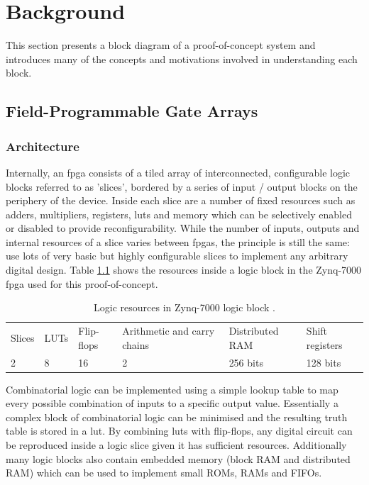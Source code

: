 \chapter{Background}

This section presents a block diagram of a proof-of-concept system and introduces many of the concepts and motivations involved in understanding each block.

\section{Field-Programmable Gate Arrays}

\subsection{Architecture}
Internally, an \gls{fpga} consists of a tiled array of interconnected, configurable logic blocks referred to as 'slices', bordered by a series of input / output blocks on the periphery of the device. Inside each slice are a number of fixed resources such as adders, multipliers, registers, \glspl{lut} and memory which can be selectively enabled or disabled to provide reconfigurability. While the number of inputs, outputs and internal resources of a slice varies between \glspl{fpga}, the principle is still the same: use lots of very basic but highly configurable slices to implement any arbitrary digital design. Table \ref{table:clb_resources} shows the resources inside a logic block in the Zynq-7000 \gls{fpga} used for this proof-of-concept.

\begin{table}
    \begin{tabular}{llllll}
        Slices  & LUTs  & Flip-flops    & Arithmetic and carry chains   & Distributed RAM   & Shift registers   \\
        2       & 8     & 16            & 2                             & 256 bits          & 128 bits
    \end{tabular}
    \caption{Logic resources in Zynq-7000 logic block \cite{xilinx:ug474}.}
    \label{table:clb_resources}
\end{table}

Combinatorial logic can be implemented using a simple lookup table to map every possible combination of inputs to a specific output value. Essentially a complex block of combinatorial logic can be minimised and the resulting truth table is stored in a \gls{lut}. By combining \glspl{lut} with flip-flops, any digital circuit can be reproduced inside a logic slice given it has sufficient resources. Additionally many logic blocks also contain embedded memory (block RAM and distributed RAM) which can be used to implement small ROMs, RAMs and FIFOs.

